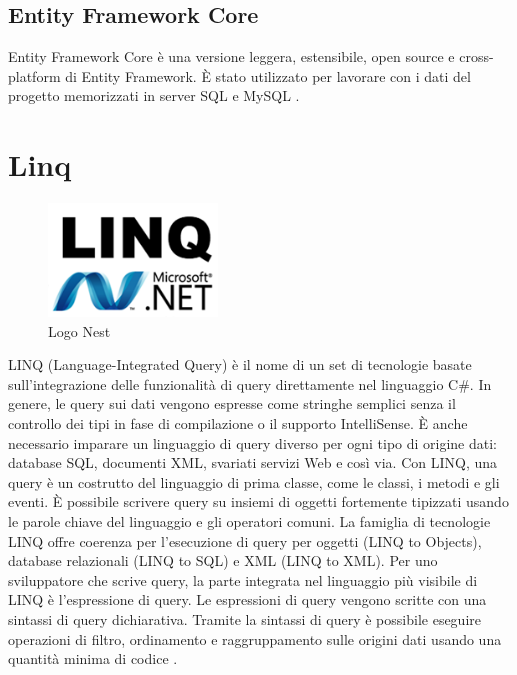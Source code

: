 \subsection{Entity Framework Core}
Entity Framework Core è una versione leggera, estensibile, open source e cross-platform di Entity Framework. È stato utilizzato per lavorare con i dati del progetto memorizzati in server SQL e MySQL \cite{EF}.

\pagebreak
\section{Linq}
\label{sec:linq}
\begin{figure}[ht!]
\begin{center}
  \includegraphics[width=4.5cm]{images/linq.png}
  \caption{Logo Nest}
\end{center}
\end{figure}
LINQ (Language-Integrated Query) è il nome di un set di tecnologie basate sull'integrazione delle funzionalità di query direttamente nel linguaggio C\#. In genere, le query sui dati vengono espresse come stringhe semplici senza il controllo dei tipi in fase di compilazione o il supporto IntelliSense. È anche necessario imparare un linguaggio di query diverso per ogni tipo di origine dati: database SQL, documenti XML, svariati servizi Web e così via. Con LINQ, una query è un costrutto del linguaggio di prima classe, come le classi, i metodi e gli eventi. È possibile scrivere query su insiemi di oggetti fortemente tipizzati usando le parole chiave del linguaggio e gli operatori comuni. La famiglia di tecnologie LINQ offre coerenza per l'esecuzione di query per oggetti (LINQ to Objects), database relazionali (LINQ to SQL) e XML (LINQ to XML). Per uno sviluppatore che scrive query, la parte integrata nel linguaggio più visibile di LINQ è l'espressione di query. Le espressioni di query vengono scritte con una sintassi di query dichiarativa. Tramite la sintassi di query è possibile eseguire operazioni di filtro, ordinamento e raggruppamento sulle origini dati usando una quantità minima di codice \cite{Linq}.

